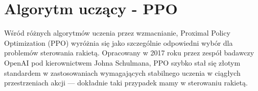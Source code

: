 \section{Algorytm uczący - PPO}
\label{sec:wybrany-model}
%
%
%
%

Wśród różnych algorytmów uczenia przez wzmacnianie, Proximal Policy Optimization (PPO) \cite{schulman2017proximalpolicyoptimizationalgorithms} wyróżnia się jako szczególnie odpowiedni wybór dla problemów sterowania rakietą. Opracowany w 2017 roku przez zespół badawczy OpenAI pod kierownictwem Johna Schulmana, PPO szybko stał się złotym standardem w zastosowaniach wymagających stabilnego uczenia w ciągłych przestrzeniach akcji — dokładnie taki przypadek mamy w sterowaniu rakietą.

